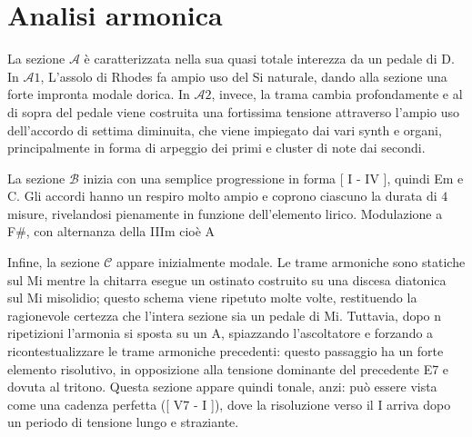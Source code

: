 \documentclass[class=book, crop=false, oneside, 12pt]{standalone}
\begin{document}
    \section{Analisi armonica}
    \label{sec:03-harmony}

    La sezione \(\mathcal{A}\) è caratterizzata nella sua quasi totale interezza da un pedale di D. In \(\mathcal{A}1\), L'assolo di Rhodes fa ampio uso del Si naturale, dando alla sezione una forte impronta modale dorica. 
    In \(\mathcal{A}2\), invece, la trama cambia profondamente e al di sopra del pedale viene costruita una fortissima tensione attraverso l'ampio uso dell'accordo di settima diminuita, che viene impiegato dai vari synth e organi, principalmente in forma di arpeggio dei primi e cluster di note dai secondi. 

    La sezione \(\mathcal{B}\) inizia con una semplice progressione in forma [ I - IV ], quindi Em e C. Gli accordi hanno un respiro molto ampio e coprono ciascuno la durata di \(4\) misure, rivelandosi pienamente in funzione dell'elemento lirico. 
    Modulazione a F\#, con alternanza della IIIm cioè A

    Infine, la sezione \(\mathcal{C}\) appare inizialmente modale. Le trame armoniche sono statiche sul Mi mentre la chitarra esegue un ostinato costruito su una discesa diatonica sul Mi misolidio; questo schema viene ripetuto molte volte, restituendo la ragionevole certezza che l'intera sezione sia un pedale di Mi. Tuttavia, dopo n ripetizioni l'armonia si sposta su un A, spiazzando l'ascoltatore e forzando a ricontestualizzare le trame armoniche precedenti: questo passaggio ha un forte elemento risolutivo, in opposizione alla tensione dominante del precedente E7 e dovuta al tritono. Questa sezione appare quindi tonale, anzi: può essere vista come una cadenza perfetta ([ V7 - I ]), dove la risoluzione verso il I arriva dopo un periodo di tensione lungo e straziante.
    
\end{document}
